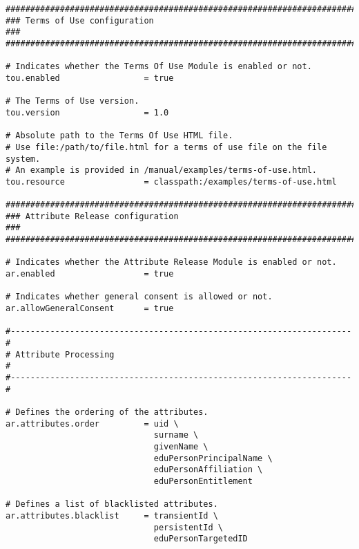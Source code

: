 \begin{lstlisting}
#######################################################################
### Terms of Use configuration                                      ###
#######################################################################

# Indicates whether the Terms Of Use Module is enabled or not.
tou.enabled                 = true

# The Terms of Use version.
tou.version                 = 1.0

# Absolute path to the Terms Of Use HTML file.
# Use file:/path/to/file.html for a terms of use file on the file system.
# An example is provided in /manual/examples/terms-of-use.html.
tou.resource                = classpath:/examples/terms-of-use.html

#######################################################################
### Attribute Release configuration                                 ###
#######################################################################

# Indicates whether the Attribute Release Module is enabled or not.
ar.enabled                  = true

# Indicates whether general consent is allowed or not.
ar.allowGeneralConsent      = true

#---------------------------------------------------------------------#
# Attribute Processing                                                #
#---------------------------------------------------------------------#

# Defines the ordering of the attributes.
ar.attributes.order         = uid \
                              surname \
                              givenName \
                              eduPersonPrincipalName \
                              eduPersonAffiliation \
                              eduPersonEntitlement

# Defines a list of blacklisted attributes.
ar.attributes.blacklist     = transientId \
                              persistentId \
                              eduPersonTargetedID

\end{lstlisting}

